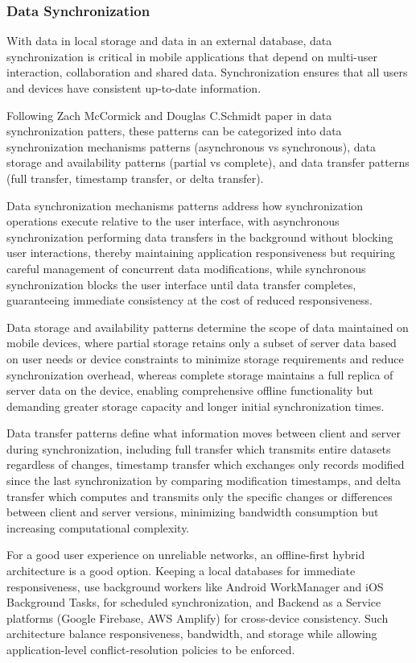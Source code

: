 \subsubsection{Data Synchronization}

With data in local storage and data in an external database, data synchronization is critical in mobile applications that depend on multi-user interaction, collaboration and shared data.
Synchronization ensures that all users and devices have consistent up-to-date information.

Following Zach McCormick and Douglas C.Schmidt paper in data synchronization patters\cite{mccormick}, these patterns can be categorized into data synchronization mechanisms patterns (asynchronous vs synchronous), data storage and availability patterns (partial vs complete), and data transfer patterns (full transfer, timestamp transfer, or delta transfer).

Data synchronization mechanisms patterns address how synchronization operations execute relative to the user interface, with asynchronous synchronization performing data transfers in the background without blocking user interactions, thereby maintaining application responsiveness but requiring careful management of concurrent data modifications, while synchronous synchronization blocks the user interface until data transfer completes, guaranteeing immediate consistency at the cost of reduced responsiveness.

Data storage and availability patterns determine the scope of data maintained on mobile devices, where partial storage retains only a subset of server data based on user needs or device constraints to minimize storage requirements and reduce synchronization overhead, whereas complete storage maintains a full replica of server data on the device, enabling comprehensive offline functionality but demanding greater storage capacity and longer initial synchronization times.

Data transfer patterns define what information moves between client and server during synchronization, including full transfer which transmits entire datasets regardless of changes, timestamp transfer which exchanges only records modified since the last synchronization by comparing modification timestamps, and delta transfer which computes and transmits only the specific changes or differences between client and server versions, minimizing bandwidth consumption but increasing computational complexity.

For a good user experience on unreliable networks, an offline-first hybrid architecture is a good option.
Keeping a local databases for immediate responsiveness, use background workers like Android WorkManager\cite{workmanager} and iOS Background Tasks\cite{iosbackgroundtasks}, for scheduled synchronization, and Backend as a Service platforms (Google Firebase, AWS Amplify) for cross-device consistency.
Such architecture balance responsiveness, bandwidth, and storage while allowing application-level conflict-resolution policies to be enforced.


